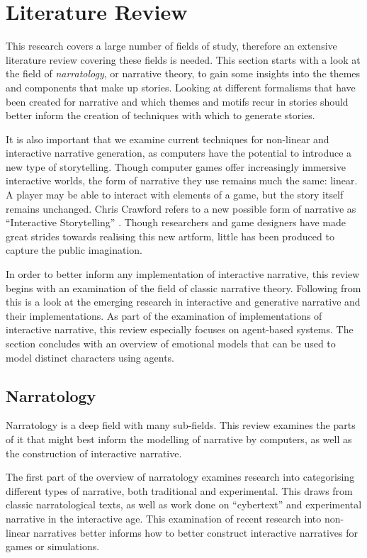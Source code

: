 \chapter{Literature Review}
\label{cha:literature-review}
This research covers a large number of fields of study, therefore an extensive
literature review covering these fields is needed. This section starts with a
look at the field of \emph{narratology}, or narrative theory, to gain some
insights into the themes and components that make up stories. Looking at
different formalisms that have been created for narrative and which themes and
motifs recur in stories should better inform the creation of techniques with
which to generate stories.

It is also important that we examine current techniques for non-linear and
interactive narrative generation, as computers have the potential to introduce a new type of storytelling. Though computer games offer increasingly immersive interactive worlds, the form of narrative they use remains much the same: linear. A player may be able to interact with elements of a game, but the story itself remains unchanged.
Chris Crawford refers to a new possible form of narrative as ``Interactive Storytelling'' \citep{crawford2012chris}. Though researchers and game designers have made great strides towards realising this new artform, little has been produced to capture the public imagination.

In order to better inform any implementation of interactive narrative, this
review begins with an examination of the field of classic narrative theory. Following from this is a look at the emerging research in interactive and generative narrative and their implementations.
As part of the examination of implementations of interactive narrative, this review especially focuses on agent-based systems. The section concludes with an overview of emotional models that can be used to model distinct characters using agents.

\section{Narratology}
\label{sec:narratology}
Narratology is a deep field with many sub-fields. This review examines the parts of it that might best inform the modelling of narrative by computers, as well as the construction of interactive narrative.

The first part of the overview of narratology examines research into categorising different types of narrative, both traditional and experimental.
This draws from classic narratological texts, as well as work done on ``cybertext'' and experimental narrative in the interactive age. This examination of recent research into non-linear narratives better informs how to better construct interactive narratives for games or simulations.


